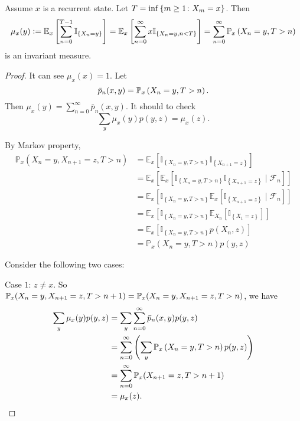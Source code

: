 \begin{thm}[Existence]
    Assume $x$ is a recurrent state. Let $T = \inf\left\{m \geq 1 \colon X_m = x\right\}$. Then
    \begin{equation*}
        \mu_x(y) \vcentcolon= \mathbb{E}_x\left[\sum_{n=0}^{T - 1}\mathbb{I}_{\left\{X_n = y\right\}}\right] = \mathbb{E}_x\left[\sum_{n=0}^\infty x\mathbb{I}_{\left\{X_n = y,n < T\right\}}\right] = \sum_{n=0}^\infty \mathbb{P}_x\left(X_n = y,T>n\right)
    \end{equation*}
    is an invariant measure.
\end{thm}
\begin{proof}
    It can see $\mu_x(x) = 1$. Let 
    \begin{equation*}
        \bar{p}_n(x,y) = \mathbb{P}_x\left(X_n = y,T>n\right).
    \end{equation*}
    Then $\mu_x(y) = \sum_{n=0}^\infty \bar{p}_n(x,y)$. It should to check
    \begin{equation*}
        \sum_y \mu_x(y)p(y,z) = \mu_x(z).
    \end{equation*}

    By Markov property,
    \begin{equation*}
        \begin{aligned}
            \mathbb{P}_x\left(X_n=y, X_{n+1}=z, T>n\right) & =\mathbb{E}_x\left[\mathbb{I}_{\left\{X_n=y, T>n\right\}} \mathbb{I}_{\left\{X_{n+1}=z\right\}}\right] \\
            & =\mathbb{E}_x\left[\mathbb{E}_x\left[\mathbb{I}_{\left\{X_n=y, T>n\right\}} \mathbb{I}_{\left\{X_{n+1}=z\right\}} \mid \mathcal{F}_n\right]\right] \\
            & =\mathbb{E}_x\left[\mathbb{I}_{\left\{X_n=y, T>n\right\}} \mathbb{E}_x\left[\mathbb{I}_{\left\{X_{n+1}=z\right\}} \mid \mathcal{F}_n\right]\right] \\
            & =\mathbb{E}_x\left[\mathbb{I}_{\left\{X_n=y, T>n\right\}} \mathbb{E}_{X_n}\left[\mathbb{I}_{\left\{X_1=z\right\}}\right]\right] \\
            & =\mathbb{E}_x\left[\mathbb{I}_{\left\{X_n=y, T>n\right\}} p\left(X_n, z\right)\right] \\
            & =\mathbb{P}_x\left(X_n=y, T>n\right) p(y, z)
        \end{aligned}
    \end{equation*}

    \noindent Consider the following two cases:

    \noindent Case $1$: $z \neq x$. So $\mathbb{P}_x(X_n = y, X_{n+1} = z, T>n+1) = \mathbb{P}_x(X_n = y, X_{n+1} = z, T>n)$, we have
    \begin{equation*}
        \begin{aligned}
            \sum_y \mu_x(y)p(y,z) &= \sum_y \sum_{n=0}^\infty \bar{p}_n(x,y) p(y,z) \\
            &= \sum_{n=0}^\infty \left(\sum_y \mathbb{P}_x\left(X_n = y,T>n\right) p(y,z)\right) \\
            &= \sum_{n=0}^\infty  \mathbb{P}_x(X_{n+1} = z, T>n+1)\\
            &= \mu_x(z).
        \end{aligned}
    \end{equation*}


\end{proof}
